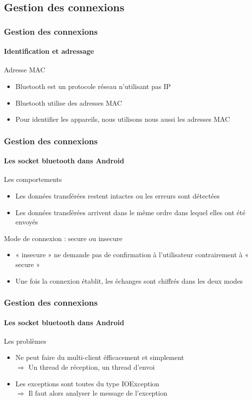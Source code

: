 \documentclass{beamer}
\begin{document}
    \subsection{Gestion des connexions}
    \begin{frame}
      \frametitle{Gestion des connexions}
      \framesubtitle{Identification et adressage}
      \begin{block}{Adresse MAC}
        \begin{itemize}
          \item Bluetooth est un protocole réseau n'utilisant pas IP
          \item Bluetooth utilise des adresses MAC
          \item Pour identifier les appareils, nous utilisons nous aussi les adresses MAC
        \end{itemize}
      \end{block}
    \end{frame}
    \begin{frame}
      \frametitle{Gestion des connexions}
      \framesubtitle{Les socket bluetooth dans Android}
      \begin{block}{Les comportements}
        \begin{itemize}
          \item Les données transférées restent intactes ou les erreurs sont détectées
          \item Les données transférées arrivent dans le même ordre dans lequel elles ont été envoyés
        \end{itemize}
      \end{block}
      \begin{block}{Mode de connexion : secure ou insecure}
        \begin{itemize}
          \item « insecure » ne demande pas de confirmation à l'utilisateur contrairement à « secure »
          \item Une fois la connexion établit, les échanges sont chiffrés dans les deux modes
        \end{itemize}
      \end{block}
    \end{frame}
    \begin{frame}
      \frametitle{Gestion des connexions}
      \framesubtitle{Les socket bluetooth dans Android}
      \begin{block}{Les problèmes}
        \begin{itemize}
          \item Ne peut faire du multi-client éfficacement et simplement \\
          $ \Rightarrow $ Un thread de réception, un thread d'envoi
          \item Les exceptions sont toutes du type IOException \\
          $ \Rightarrow $ Il faut alors analyser le message de l'exception
        \end{itemize}
      \end{block}
    \end{frame}
\end{document}
